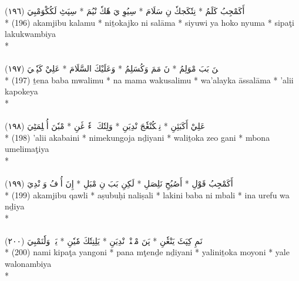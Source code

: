 \documentclass[a4paper, 12pt]{report}
\begin{document}
\begin{center}
\textarabic{(١٩٦) \textcolor{mygreen}{أَكَمْجِبُ كَلَمُ  * نِتٗكَجكٗ نِ سَلَامَ  * سِيُوِ يَ هٗكٗ نْيُمَ  * سِپَٹِ لَكُكْوَمْبِيَ }} \\* 
(196) akamjibu kalamu  * niṯokajko ni salāma  * siyuwi ya hoko nyuma  * sipaţi lakukwambiya  \\* 
 \\ 
\\[8mm] 

\textarabic{(١٩٧) \textcolor{mygreen}{تٖنَ بَبَ مْوَلِمُ  * نَ مَمَ وَكُسَلِمُ  * وَعَلَيْكَ السَّلَامَ  * عَلِيْ كَپٗكٖيَ }} \\* 
(197) ṯena baba mwalimu  * na mama wakusalimu  * wa'alayka āssaّlāma  * 'alii kapokeya  \\* 
 \\ 
\\[8mm] 

\textarabic{(١٩٨) \textcolor{mygreen}{عَلِيْ أَكَبَئِنِ  * نِمٖكُنْڠٗجَ نْدِيَنِ  * وَلِتٗكَ زٖءٗ ڠَنِ  * مْبٗنَ أُمٖلِمَٹِيَ }} \\* 
(198) 'alii akabaini  * nimekungoja nḏiyani  * waliṯoka zeo gani  * mbona umelimaţiya  \\* 
 \\ 
\\[8mm] 

\textarabic{(١٩٩) \textcolor{mygreen}{أَكَمْجِبُ قَوْلِ  * أَصُبُحِ نَلِصَلِ  * لَكِنِ بَبَ نِ مْبَلِ  * إِنَ أُرٖفُ وَ نْدِيَ }} \\* 
(199) akamjibu qawli  * aṣubuḥi naliṣali  * lakini baba ni mbali  * ina urefu wa nḏiya  \\* 
 \\ 
\\[8mm] 

\textarabic{(٢٠٠) \textcolor{mygreen}{نَمِ كِپَٹَ يَنْڠٗنِ  * پَنَ مْٹٖنْدٖ نْدِيَنِ  * يَلِنِتٗكَ مٗيٗنِ  * يَلٖ وَلٗنَمْبِيَ }} \\* 
(200) nami kipaţa yangoni  * pana mţenḏe nḏiyani  * yaliniṯoka moyoni  * yale walonambiya  \\* 
 \\ 
\\[8mm] 


\end{center}
\end{document}
